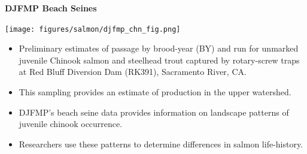 \documentclass[]{article}\usepackage[]{graphicx}\usepackage[]{color}
\begin{document}
\vspace{0.5cm}

\begin{Row}
  \begin{Cell}{7}
    \begin{center}
      {\bf {\large DJFMP Beach Seines}}
    \end{center}
  \end{Cell}
  \begin{Cell}{6}
  \end{Cell}
\end{Row}


\begin{Row}
  \begin{Cell}{7}
    \begin{center}
      \texttt{[image: figures/salmon/djfmp\_chn\_fig.png]}
    \end{center}
  \end{Cell}
  \begin{Cell}{6}
    \begin{center}
      \begin{itemize}[leftmargin=*]
        \item Preliminary estimates of passage by brood-year (BY) and run for 
        unmarked juvenile Chinook salmon and steelhead trout captured by rotary-screw 
        traps at Red Bluff Diversion Dam (RK391), Sacramento River, CA.
        \item This sampling provides an estimate of production in the upper watershed.
      \end{itemize}
    \end{center}
    \vspace{3cm} 
    \begin{center}
      \begin{itemize}[leftmargin=*]
        \item DJFMP’s beach seine data provides information on landscape patterns of 
        juvenile chinook occurrence.
        \item Researchers use these patterns to determine differences in salmon 
        life-history.
      \end{itemize}
    \end{center}
  \end{Cell}
\end{Row}


\newpage
\end{document}

